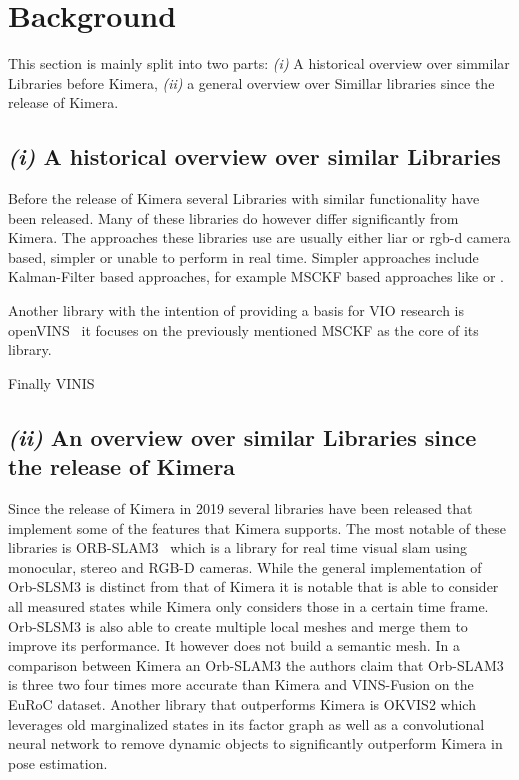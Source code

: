 \documentclass[11pt,a4paper]{article}
\begin{document}
\section{Background} \label{Sec:background}
This section is mainly split into two parts: \emph{(i)} A historical overview over simmilar Libraries before Kimera, \emph{(ii)} a general overview over Simillar libraries since the release of Kimera.
\subsection*{\emph{(i)} A historical overview over similar Libraries}
Before the release of Kimera several Libraries with similar functionality have been released. 
Many of these libraries do however differ significantly from Kimera.
The approaches these libraries use are usually either liar or rgb-d camera based, simpler or unable to perform in real time. 
Simpler approaches include Kalman-Filter based approaches, for example MSCKF based approaches like 
\cite{MSCKF} or \cite{sun2018robust}. 


Another library with the intention of providing a basis for VIO research is openVINS~\cite{Geneva2020ICRA} it focuses on the previously mentioned MSCKF as the core of its library. 




Finally VINIS
\subsection*{\emph{(ii)} An overview over similar Libraries since the release of Kimera}
Since the release of Kimera in 2019 several libraries have been released that implement some of the features that Kimera supports.
The most notable of these libraries is ORB-SLAM3~\cite{ORBSLAM3} which is a library for real time visual slam using monocular, stereo and RGB-D cameras. 
While the general implementation of Orb-SLSM3 is distinct from that of Kimera it is notable that is able to consider all measured states while Kimera only considers those in a certain time frame. 
Orb-SLSM3 is also able to create multiple local meshes and merge them to improve its performance.
It however does not build a semantic mesh. 
In a comparison between Kimera an Orb-SLAM3 the authors claim that Orb-SLAM3 is three two four times more accurate than Kimera and VINS-Fusion on the EuRoC dataset. 
Another library that outperforms Kimera is OKVIS2 \cite{leutenegger2022okvis2} which leverages old marginalized states in its factor graph as well as a convolutional neural network to remove dynamic objects to significantly outperform Kimera in pose estimation. 
\end{document}
